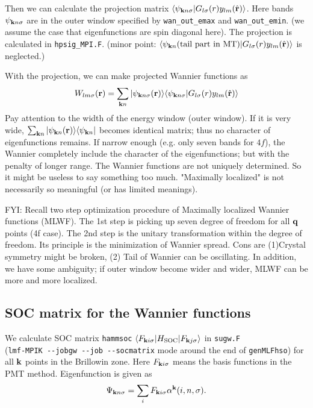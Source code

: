\documentclass[a4paper,10pt,fleqn]{article}
\newcommand{\bfq}{{\bf q}}
\newcommand{\bfk}{{\bf k}}
\newcommand{\bfr}{{\bf r}}
\begin{document}
Then we can calculate the projection matrix 
$\langle \psi_{\bfk n \sigma}|G_{l \sigma} (r)y_{lm}(\hat{\bfr})\rangle$.
Here bands $\psi_{\bfk n \sigma}$ are in the outer window specified by \verb#wan_out_emax# and \verb#wan_out_emin#. 
(we assume the case that eigenfunctions are spin diagonal here).
The projection is calculated in \verb#hpsig_MPI.F#.
(minor point: $\langle \psi_{\bfk n}({\rm tail \ part \ in \ MT})
|G_{l \sigma} (r)y_{lm}(\hat{\bfr})\rangle$ is neglected.)

With the projection, we can make projected Wannier functions as
\begin{eqnarray}
W_{lm\sigma}(\bfr)= \sum_{\bfk n}|\psi_{\bfk n\sigma}(\bfr) \rangle \langle \psi_{\bfk n\sigma}|G_{l \sigma} (r)y_{lm}(\hat{\bfr})\rangle
\end{eqnarray}
Pay attention to the width of the energy window (outer window). If it is very wide,
$\sum_{\bfk n}|\psi_{\bfk n}(\bfr) \rangle \langle \psi_{\bfk n}|$ becomes identical matrix;
thus no character of eigenfunctions remains.
If narrow enough (e.g. only seven bands for $4f$), the Wannier completely include the
character of the eigenfunctions; but with the penalty of longer range.
The Wannier functions are not uniquely determined. So it might be useless 
to say something too much. "Maximally localized" is not necessarily so meaningful (or has limited meanings).

FYI:
Recall two step optimization procedure of Maximally localized Wannier functions (MLWF).
The 1st step is picking up seven degree of freedom for all $\bfq$ points
(4f case). The 2nd step is the unitary transformation 
within the degree of freedom. Its principle is the minimization of Wannier spread. Cons are (1)Crystal symmetry might be broken,
(2) Tail of Wannier can be oscillating. In addition, we have some ambiguity; if outer window become wider and wider, 
MLWF can be more and more localized. 



\subsection{SOC matrix for the Wannier functions}
We calculate SOC matrix \verb#hammsoc# 
$\langle F_{\bfk i \sigma} |H_{\rm SOC}|F_{\bfk j \sigma} \rangle$ in \verb#sugw.F#\\
(\verb#lmf-MPIK --jobgw --job --socmatrix# mode around the end of \verb#genMLFhso#)
for all $\bfk$ points in the Brillowin zone. Here 
$F_{\bfk i \sigma}$ means the basis functions in the PMT method.
Eigenfunction is given as 
\begin{eqnarray}
\Psi_{\bfk n \sigma}=\sum_i F_{\bfk i \sigma} \alpha^\bfk(i,n,\sigma) .
\end{eqnarray}
\end{document}
